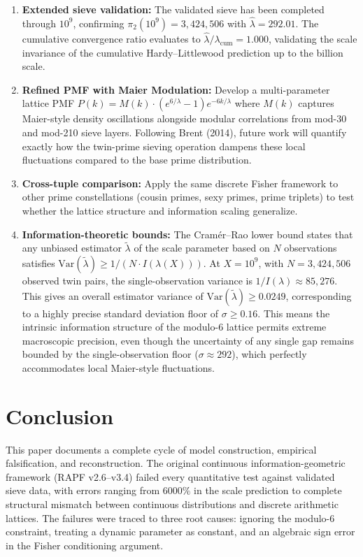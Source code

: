 \documentclass[11pt]{article}
\begin{document}
\begin{enumerate}
    \item \textbf{Extended sieve validation:} The validated sieve has been completed through $10^9$, confirming $\pi_2(10^9) = 3{,}424{,}506$ with $\hat{\lambda} = 292.01$. The cumulative convergence ratio evaluates to $\hat{\lambda}/\lambda_{\text{cum}} = 1.000$, validating the scale invariance of the cumulative Hardy--Littlewood prediction up to the billion scale.
    
    \item \textbf{Refined PMF with Maier Modulation:} Develop a multi-parameter lattice PMF $P(k) = M(k) \cdot (e^{6/\lambda}-1)e^{-6k/\lambda}$ where $M(k)$ captures Maier-style density oscillations alongside modular correlations from mod-30 and mod-210 sieve layers. Following Brent (2014), future work will quantify exactly how the twin-prime sieving operation dampens these local fluctuations compared to the base prime distribution.
    
    \item \textbf{Cross-tuple comparison:} Apply the same discrete Fisher framework to other prime constellations (cousin primes, sexy primes, prime triplets) to test whether the lattice structure and information scaling generalize.
    
    \item \textbf{Information-theoretic bounds:} The Cram\'{e}r--Rao lower bound states that any unbiased estimator $\tilde{\lambda}$ of the scale parameter based on $N$ observations satisfies $\text{Var}(\tilde{\lambda}) \geq 1/(N \cdot I(\lambda(X)))$.
At $X = 10^9$, with $N = 3{,}424{,}506$ observed twin pairs, the single-observation variance is $1/I(\lambda) \approx 85{,}276$. This gives an overall estimator variance of $\text{Var}(\tilde{\lambda}) \geq 0.0249$, corresponding to a highly precise standard deviation floor of $\sigma \geq 0.16$.
This means the intrinsic information structure of the modulo-6 lattice permits extreme macroscopic precision, even though the uncertainty of any single gap remains bounded by the single-observation floor ($\sigma \approx 292$), which perfectly accommodates local Maier-style fluctuations.
\end{enumerate}

\section{Conclusion}

This paper documents a complete cycle of model construction, empirical falsification, and reconstruction. The original continuous information-geometric framework (RAPF v2.6--v3.4) failed every quantitative test against validated sieve data, with errors ranging from $6000\%$ in the scale prediction to complete structural mismatch between continuous distributions and discrete arithmetic lattices. The failures were traced to three root causes: ignoring the modulo-6 constraint, treating a dynamic parameter as constant, and an algebraic sign error in the Fisher conditioning argument.
\end{document}
